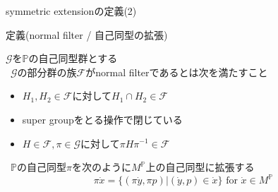 \documentclass[17pt,aspectratio=169]{beamer}
\newcommand{\Pbb}{\mathbb{P}}
\newcommand{\Gcal}{\mathcal{G}}
\newcommand{\Fcal}{\mathcal{F}}
\begin{document}

\begin{frame}{symmetric extensionの定義(2)}
    \vspace{-7pt}
    \begin{itembox}[l]{定義(normal filter / {\small 自己同型の拡張})}
        {\small
            $\Gcal$を$\Pbb$の自己同型群とする  \\
            \textbullet\,\,\,$\Gcal$の部分群の族$\Fcal$がnormal filterであるとは次を満たすこと
            \vspace{-5pt}
            \begin{itemize}[left=1cm]
                \setlength{\itemsep}{0pt}
                \item [\textasteriskcentered] $H_1, H_2 \in \Fcal$に対して$H_1 \cap H_2 \in \Fcal$
                \item [\textasteriskcentered] super groupをとる操作で閉じている
                \item [\textasteriskcentered] $H \in \Fcal, \pi \in \Gcal$に対して$\pi H \pi^{-1} \in \Fcal$
            \end{itemize}
            \vspace{-3pt}
            \textbullet \,\,\,$\Pbb$の自己同型$\pi$を次のように$M^\Pbb$上の自己同型に拡張する
            \vspace{-5pt}
            $$ \pi \dot{x} = \{ (\pi \dot{y}, \pi p) | (\dot{y}, p) \in \dot{x} \} \text{ for } \dot{x} \in M^\Pbb $$
        }
            
    \end{itembox}
\end{frame}
\end{document}
